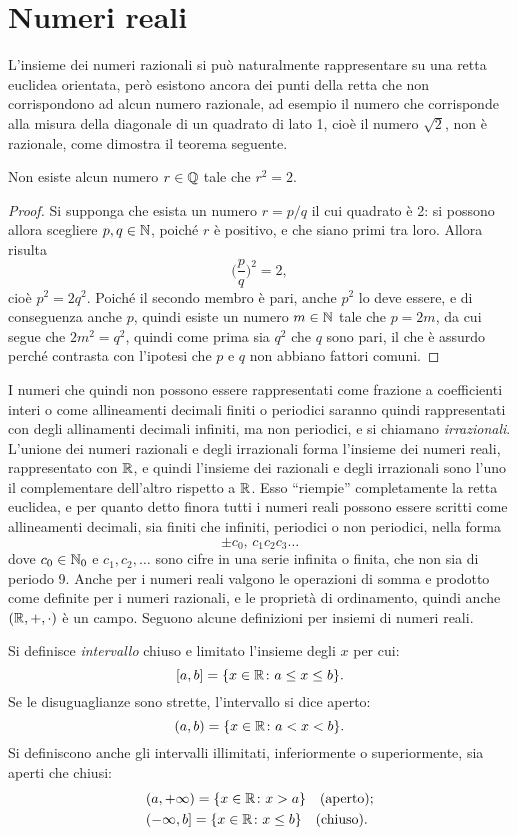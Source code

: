 \section{Numeri reali}
L'insieme dei numeri razionali si può naturalmente rappresentare su una retta euclidea orientata, però esistono ancora dei punti della retta che non corrispondono ad alcun numero razionale, ad esempio il numero che corrisponde alla misura della diagonale di un quadrato di lato 1, cioè il numero $\sqrt{2}$, non è razionale, come dimostra il teorema seguente.
\begin{teorema}
Non esiste alcun numero $r\in\mathbb{Q}$ tale che $r^2=2$.
\end{teorema}
\begin{proof}
Si supponga che esista un numero $r=p/q$ il cui quadrato è 2: si possono allora scegliere $p,q\in\mathbb{N}$, poiché $r$ è positivo, e che siano primi tra loro. Allora risulta
\[
\Big(\frac{p}{q}\Big)^2=2,
\]
cioè $p^2=2q^2$. Poiché il secondo membro è pari, anche $p^2$ lo deve essere, e di conseguenza anche $p$, quindi esiste un numero $m\in\mathbb{N}$ tale che $p=2m$, da cui segue che $2m^2=q^2$, quindi come prima sia $q^2$ che $q$ sono pari, il che è assurdo perché contrasta con l'ipotesi che $p$ e $q$ non abbiano fattori comuni.
\end{proof}
I numeri che quindi non possono essere rappresentati come frazione a coefficienti interi o come allineamenti decimali finiti o periodici saranno quindi rappresentati con degli allinamenti decimali infiniti, ma non periodici, e si chiamano \emph{irrazionali}.
L'unione dei numeri razionali e degli irrazionali forma l'insieme dei numeri reali, rappresentato con $\mathbb{R}$, e quindi l'insieme dei razionali e degli irrazionali sono l'uno il complementare dell'altro rispetto a $\mathbb{R}$. Esso ``riempie'' completamente la retta euclidea, e per quanto detto finora tutti i numeri reali possono essere scritti come allineamenti decimali, sia finiti che infiniti, periodici o non periodici, nella forma
\[
\pm c_0,\,c_1c_2c_3\dots
\]
dove $c_0\in\mathbb{N}_0$ e $c_1,c_2,\dots$ sono cifre in una serie infinita o finita, che non sia di periodo 9.
Anche per i numeri reali valgono le operazioni di somma e prodotto come definite per i numeri razionali, e le proprietà di ordinamento, quindi anche $(\mathbb{R},+,\cdot)$ è un campo.
Seguono alcune definizioni per insiemi di numeri reali.
\begin{definizione}
Si definisce \emph{intervallo} chiuso e limitato l'insieme degli $x$ per cui:
\[
[a,b]=\{x\in\mathbb{R}\colon a\leq x\leq b\}.
\]
Se le disuguaglianze sono strette, l'intervallo si dice aperto:
\[
(a,b)=\{x\in\mathbb{R}\colon a<x<b\}.
\]
Si definiscono anche gli intervalli illimitati, inferiormente o superiormente, sia aperti che chiusi:
\begin{align*}
&(a,+\infty)=\{x\in\mathbb{R}\colon x>a\}\quad\text{(aperto)};\\
&(-\infty,b]=\{x\in\mathbb{R}\colon x\leq b\}\quad\text{(chiuso)}.
\end{align*}
\end{definizione}
